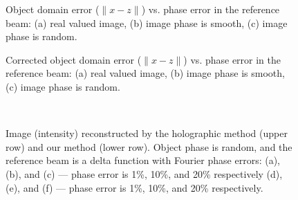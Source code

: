 \begin{figure}[H]
  \centering
  \qquad{}
  \caption[Object domain error vs. phase error in the
    reference beam]{Object domain error ($\|x-z\|$) vs. phase error in the
    reference beam: (a) real valued image,
    (b) image phase is smooth, (c) image phase is random.}
  \label{fig:objectdomain-error}
\end{figure}


\begin{figure}[H]
  \centering
  \qquad{}
  \caption[Corrected object domain error  vs. phase error in the
    reference beam]{Corrected object domain error ($\|x-z\|$) vs. phase error in the
    reference beam: (a) real valued image,
    (b) image phase is smooth, (c) image phase is random.}
  \label{fig:objectdomain-error-corrected}
\end{figure}


\begin{figure}[H]
  \centering
  \quad{}
  \quad{}
  \\
  \quad{}
  \quad{}
  \caption[Image reconstructed by the holographic method
    and our method]{Image (intensity) reconstructed by the holographic method
    (upper row) and our method (lower row). Object phase is random,
    and the reference beam is a delta function with Fourier phase
    errors: 
    (a), (b), and (c) --- phase error is 1\%, 10\%, and 20\% respectively
    (d), (e), and (f) --- phase error is 1\%, 10\%, and 20\% respectively.}
  \label{fig:visual-results-phase-error}
\end{figure}



